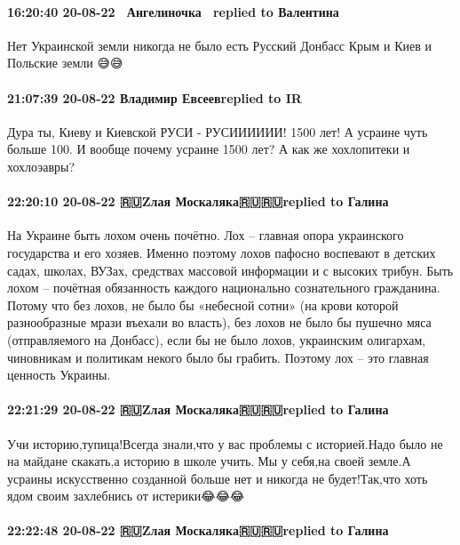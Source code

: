 \paragraph{16:20:40 20-08-22 🧚‍♀️Ангелиночка 🧚‍♀️replied to Валентина}

Нет Украинской земли никогда не было есть Русский Донбасс Крым и Киев и
Польские земли 😅😅

\paragraph{21:07:39 20-08-22 Владимир Евсеевreplied to IR}

Дура ты, Киеву и Киевской РУСИ - РУСИИИИИИ! 1500 лет! А усраине чуть больше
100. И вообще почему усраине 1500 лет? А как же хохлопитеки и хохлоэавры?

\paragraph{22:20:10 20-08-22 🇷🇺Zлая Москаляка🇷🇺🇷🇺replied to Галина}

На Украине быть лохом очень почётно. Лох – главная опора украинского
государства и его хозяев. Именно поэтому лохов пафосно воспевают в детских
садах, школах, ВУЗах, средствах массовой информации и с высоких трибун. Быть
лохом – почётная обязанность каждого национально сознательного гражданина.
Потому что без лохов, не было бы «небесной сотни» (на крови которой
разнообразные мрази въехали во власть), без лохов не было бы пушечно мяса
(отправляемого на Донбасс), если бы не было лохов, украинским олигархам,
чиновникам и политикам некого было бы грабить. Поэтому лох – это главная
ценность Украины.

\paragraph{22:21:29 20-08-22 🇷🇺Zлая Москаляка🇷🇺🇷🇺replied to Галина}

Учи историю,тупица!Всегда знали,что у вас проблемы с историей.Надо было не на
майдане скакать,а историю в школе учить.🤣Мы у себя,на своей земле.А усраины
искусственно созданной больше нет и никогда не будет!Так,что хоть ядом своим
захлебнись от истерики😂😂😂

\paragraph{22:22:48 20-08-22 🇷🇺Zлая Москаляка🇷🇺🇷🇺replied to Галина}

